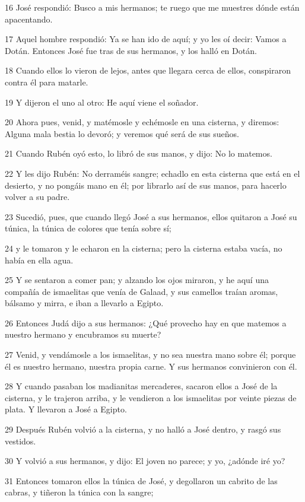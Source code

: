 \par 16 José respondió: Busco a mis hermanos; te ruego que me muestres dónde están apacentando.
\par 17 Aquel hombre respondió: Ya se han ido de aquí; y yo les oí decir: Vamos a Dotán. Entonces José fue tras de sus hermanos, y los halló en Dotán.
\par 18 Cuando ellos lo vieron de lejos, antes que llegara cerca de ellos, conspiraron contra él para matarle.
\par 19 Y dijeron el uno al otro: He aquí viene el soñador.
\par 20 Ahora pues, venid, y matémosle y echémosle en una cisterna, y diremos: Alguna mala bestia lo devoró; y veremos qué será de sus sueños.
\par 21 Cuando Rubén oyó esto, lo libró de sus manos, y dijo: No lo matemos.
\par 22 Y les dijo Rubén: No derraméis sangre; echadlo en esta cisterna que está en el desierto, y no pongáis mano en él; por librarlo así de sus manos, para hacerlo volver a su padre.
\par 23 Sucedió, pues, que cuando llegó José a sus hermanos, ellos quitaron a José su túnica, la túnica de colores que tenía sobre sí;
\par 24 y le tomaron y le echaron en la cisterna; pero la cisterna estaba vacía, no había en ella agua.
\par 25 Y se sentaron a comer pan; y alzando los ojos miraron, y he aquí una compañía de ismaelitas que venía de Galaad, y sus camellos traían aromas, bálsamo y mirra, e iban a llevarlo a Egipto.
\par 26 Entonces Judá dijo a sus hermanos: ¿Qué provecho hay en que matemos a nuestro hermano y encubramos su muerte?
\par 27 Venid, y vendámosle a los ismaelitas, y no sea nuestra mano sobre él; porque él es nuestro hermano, nuestra propia carne. Y sus hermanos convinieron con él.
\par 28 Y cuando pasaban los madianitas mercaderes, sacaron ellos a José de la cisterna, y le trajeron arriba, y le vendieron a los ismaelitas por veinte piezas de plata. Y llevaron a José a Egipto.
\par 29 Después Rubén volvió a la cisterna, y no halló a José dentro, y rasgó sus vestidos.
\par 30 Y volvió a sus hermanos, y dijo: El joven no parece; y yo, ¿adónde iré yo?
\par 31 Entonces tomaron ellos la túnica de José, y degollaron un cabrito de las cabras, y tiñeron la túnica con la sangre;
